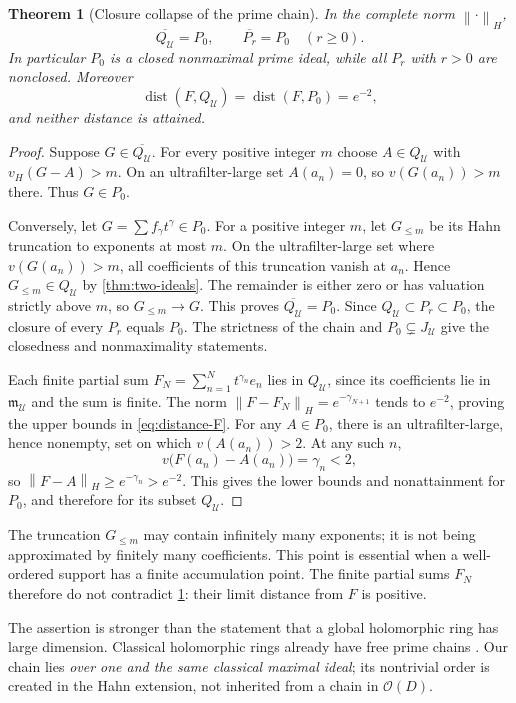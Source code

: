 \documentclass[11pt,letterpaper]{article}
\numberwithin{equation}{section}
\newtheorem{theorem}{Theorem}[section]
\theoremstyle{definition}
\theoremstyle{remark}
\newcommand{\OO}{\mathcal O}
\newcommand{\UU}{\mathcal U}
\newcommand{\mm}{\mathfrak m}
\newcommand{\vH}{v_{\!H}}
\newcommand{\norm}[1]{\left\lVert#1\right\rVert}
\begin{document}
\begin{theorem}[Closure collapse of the prime chain]
\label{thm:closure}
In the complete norm $\norm{\cdot}_H$,
\[
 \overline{Q_\UU}=P_0,\qquad \overline{P_r}=P_0\quad(r\ge0).
\]
In particular $P_0$ is a closed nonmaximal prime ideal, while all $P_r$
with $r>0$ are nonclosed. Moreover
\begin{equation}\label{eq:distance-F}
 \operatorname{dist}(F,Q_\UU)
 =\operatorname{dist}(F,P_0)=e^{-2},
\end{equation}
and neither distance is attained.
\end{theorem}
\begin{proof}
Suppose $G\in\overline{Q_\UU}$. For every positive integer $m$ choose
$A\in Q_\UU$ with $\vH(G-A)>m$. On an ultrafilter-large set $A(a_n)=0$,
so $v(G(a_n))>m$ there. Thus $G\in P_0$.

Conversely, let $G=\sum f_\gamma t^\gamma\in P_0$. For a positive
integer $m$, let $G_{\le m}$ be its Hahn truncation to exponents at most
$m$. On the ultrafilter-large set where $v(G(a_n))>m$, all coefficients
of this truncation vanish at $a_n$. Hence $G_{\le m}\in Q_\UU$ by
\cref{thm:two-ideals}. The remainder is either zero or has valuation
strictly above $m$, so $G_{\le m}\to G$. This proves
$\overline{Q_\UU}=P_0$. Since $Q_\UU\subset P_r\subset P_0$,
the closure of every $P_r$ equals $P_0$. The strictness of the chain and
$P_0\subsetneq J_\UU$ give the closedness and nonmaximality statements.

Each finite partial sum $F_N=\sum_{n=1}^N t^{\gamma_n}e_n$ lies in
$Q_\UU$, since its coefficients lie in $\mm_\UU$ and the sum is finite.
The norm $\norm{F-F_N}_H=e^{-\gamma_{N+1}}$ tends to $e^{-2}$, proving
the upper bounds in \eqref{eq:distance-F}. For any $A\in P_0$, there is
an ultrafilter-large, hence nonempty, set on which $v(A(a_n))>2$.
At any such $n$,
\[
 v\bigl(F(a_n)-A(a_n)\bigr)=\gamma_n<2,
\]
so $\norm{F-A}_H\ge e^{-\gamma_n}>e^{-2}$. This gives the lower bounds
and nonattainment for $P_0$, and therefore for its subset $Q_\UU$.
\end{proof}

The truncation $G_{\le m}$ may contain infinitely many exponents; it is
not being approximated by finitely many coefficients. This point is
essential when a well-ordered support has a finite accumulation point.
The finite partial sums $F_N$ therefore do not contradict
\cref{thm:closure}: their limit distance from $F$ is positive.

The assertion is stronger than the statement that a global holomorphic
ring has large dimension. Classical holomorphic rings already have free
prime chains \cite{Henriksen53}. Our chain lies \emph{over one and the
same classical maximal ideal}; its nontrivial order is created in the
Hahn extension, not inherited from a chain in $\OO(D)$.
\end{document}
